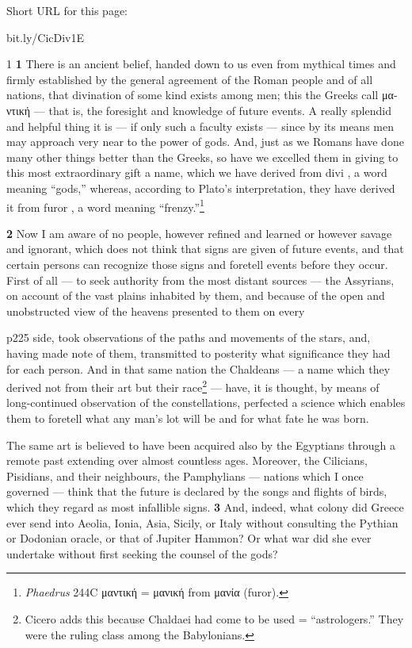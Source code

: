 
Short URL for this page:

bit.ly/CicDiv1E

1
\textbf{1} There is an ancient belief, handed down to us even from mythical times and firmly established by the general agreement of the Roman people and of all nations, that divination of some kind exists among men; this the Greeks call \textgreek{μαντική} \texthebrew{—} that is, the foresight and knowledge of future events. A really splendid and helpful thing it is \texthebrew{—} if only such a faculty exists \texthebrew{—} since by its means men may approach very near to the power of gods. And, just as we Romans have done many other things better than the Greeks, so have we excelled them in giving to this most extraordinary gift a name, which we have derived from divi , a word meaning ``gods,'' whereas, according to Plato's interpretation, they have derived it from furor , a word meaning ``frenzy.''\footnote{\emph{Phaedrus} 244C \textgreek{μαντική} = \textgreek{μανική} from \textgreek{μανία} (furor).

}

\textbf{2} Now I am aware of no people, however refined and learned or however savage and ignorant, which does not think that signs are given of future events, and that certain persons can recognize those signs and foretell events before they occur. First of all \texthebrew{—} to seek authority from the most distant sources \texthebrew{—} the Assyrians, on account of the vast plains inhabited by them, and because of the open and unobstructed view of the heavens presented to them on every

p225 side, took observations of the paths and movements of the stars, and, having made note of them, transmitted to posterity what significance they had for each person. And in that same nation the Chaldeans \texthebrew{—} a name which they derived not from their art but their race\texthebrew{}\footnote{Cicero adds this because Chaldaei had come to be used = ``astrologers.'' They were the ruling class among the Babylonians.

} \texthebrew{—} have, it is thought, by means of long-continued observation of the constellations, perfected a science which enables them to foretell what any man's lot will be and for what fate he was born.

The same art is believed to have been acquired also by the Egyptians through a remote past extending over almost countless ages. Moreover, the Cilicians, Pisidians, and their neighbours, the Pamphylians \texthebrew{—} nations which I once governed \texthebrew{—} think that the future is declared by the songs and flights of birds, which they regard as most infallible signs. \textbf{3} And, indeed, what colony did Greece ever send into Aeolia, Ionia, Asia, Sicily, or Italy without consulting the Pythian or Dodonian oracle, or that of Jupiter Hammon? Or what war did she ever undertake without first seeking the counsel of the gods?

